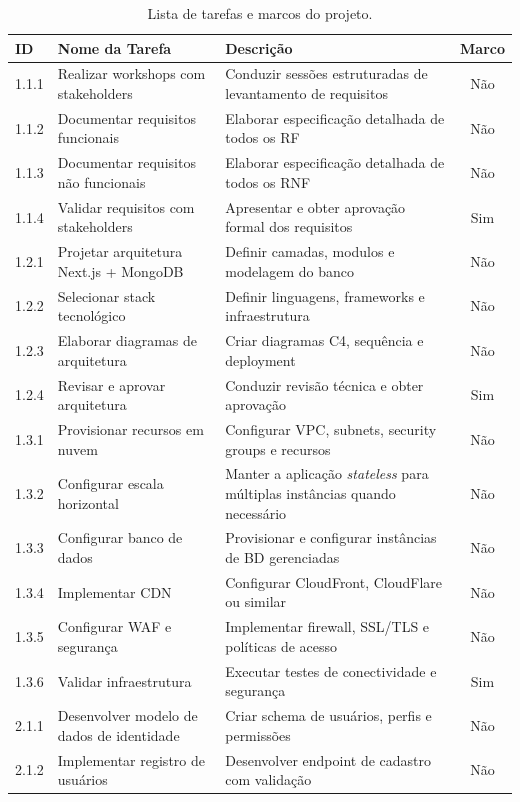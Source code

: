 \begin{table}[H]
\centering
\caption{Lista de tarefas e marcos do projeto.}%
\label{tab:tarefas}
\footnotesize
\begin{tabular}{|p{0.9cm}|p{6.2cm}|p{5.7cm}|c|}
\hline
\textbf{ID} & \textbf{Nome da Tarefa} & \textbf{Descrição} & \textbf{Marco} \\ \hline
1.1.1 & Realizar workshops com stakeholders & Conduzir sessões estruturadas de levantamento de requisitos & Não \\ \hline
1.1.2 & Documentar requisitos funcionais & Elaborar especificação detalhada de todos os RF & Não \\ \hline
1.1.3 & Documentar requisitos não funcionais & Elaborar especificação detalhada de todos os RNF & Não \\ \hline
1.1.4 & Validar requisitos com stakeholders & Apresentar e obter aprovação formal dos requisitos & Sim \\ \hline
1.2.1 & Projetar arquitetura Next.js + MongoDB & Definir camadas, modulos e modelagem do banco & Não \\ \hline
1.2.2 & Selecionar stack tecnológico & Definir linguagens, frameworks e infraestrutura & Não \\ \hline
1.2.3 & Elaborar diagramas de arquitetura & Criar diagramas C4, sequência e deployment & Não \\ \hline
1.2.4 & Revisar e aprovar arquitetura & Conduzir revisão técnica e obter aprovação & Sim \\ \hline
1.3.1 & Provisionar recursos em nuvem & Configurar VPC, subnets, security groups e recursos & Não \\ \hline
1.3.2 & Configurar escala horizontal & Manter a aplicação \textit{stateless} para múltiplas instâncias quando necessário & Não \\ \hline
1.3.3 & Configurar banco de dados & Provisionar e configurar instâncias de BD gerenciadas & Não \\ \hline
1.3.4 & Implementar CDN & Configurar CloudFront, CloudFlare ou similar & Não \\ \hline
1.3.5 & Configurar WAF e segurança & Implementar firewall, SSL/TLS e políticas de acesso & Não \\ \hline
1.3.6 & Validar infraestrutura & Executar testes de conectividade e segurança & Sim \\ \hline
2.1.1 & Desenvolver modelo de dados de identidade & Criar schema de usuários, perfis e permissões & Não \\ \hline
2.1.2 & Implementar registro de usuários & Desenvolver endpoint de cadastro com validação & Não \\ \hline

\end{tabular}
\end{table}
